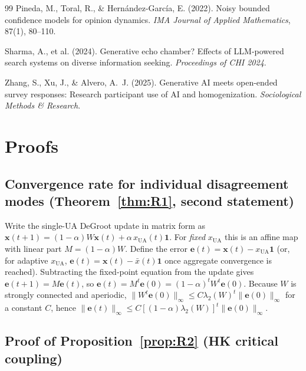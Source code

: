 \documentclass{article}
\theoremstyle{plain}
\theoremstyle{definition}
\theoremstyle{remark}
\newcommand{\bx}{\mathbf{x}}
\newcommand{\bone}{\mathbf{1}}
\newcommand{\xUA}{x_{\mathrm{UA}}}
\newcommand{\xbar}{\bar{x}}
\begin{document}
\begin{thebibliography}{99}
Pineda, M., Toral, R., \& Hern\'{a}ndez-Garc\'{i}a, E. (2022).
Noisy bounded confidence models for opinion dynamics.
\textit{IMA Journal of Applied Mathematics}, 87(1), 80--110.

Sharma, A., et al. (2024).
Generative echo chamber? Effects of LLM-powered search systems on diverse information seeking.
\textit{Proceedings of CHI 2024}.

Zhang, S., Xu, J., \& Alvero, A.~J. (2025).
Generative AI meets open-ended survey responses: Research participant use of AI and homogenization.
\textit{Sociological Methods \& Research}.

\end{thebibliography}

\clearpage
\appendix
\section{Proofs}
\label{app:proofs}

\subsection{Convergence rate for individual disagreement modes
(Theorem~\ref{thm:R1}, second statement)}

Write the single-UA DeGroot update in matrix form as
$\bx(t+1)=(1-\alpha)W\bx(t)+\alpha\,\xUA(t)\bone$.  For \emph{fixed}
$\xUA$ this is an affine map with linear part $M=(1-\alpha)W$.
Define the error $\mathbf{e}(t)=\bx(t)-\xUA\bone$ (or, for adaptive
$\xUA$, $\mathbf{e}(t)=\bx(t)-\xbar(t)\bone$ once aggregate
convergence is reached).  Subtracting the fixed-point equation from
the update gives $\mathbf{e}(t+1)=M\mathbf{e}(t)$, so
$\mathbf{e}(t)=M^t\mathbf{e}(0)=(1-\alpha)^t W^t \mathbf{e}(0)$.
Because $W$ is strongly connected and aperiodic,
$\|W^t\mathbf{e}(0)\|_\infty\le C\lambda_2(W)^t\|\mathbf{e}(0)\|_\infty$
for a constant $C$, hence
$\|\mathbf{e}(t)\|_\infty\le C[(1-\alpha)\lambda_2(W)]^t\|\mathbf{e}(0)\|_\infty$.

\subsection{Proof of Proposition~\ref{prop:R2} (HK critical coupling)}
\end{document}

